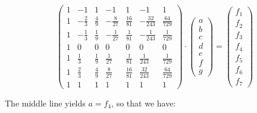 \[
\left(
\begin{array}{ccccccc}
1& -1       & 1       & -1           & 1 & -1 & 1  \\
1& -\frac23 & \frac49 & -\frac{8}{27}& \frac{16}{81} & -\frac{32}{243} & \frac{64}{729}  \\
1& -\frac13 & \frac19 & -\frac{1}{27}& \frac{1}{81}  & -\frac{1}{243}  & \frac{1}{729}  \\
1& 0        & 0       & 0            &0 & 0 & 0 \\
1& \frac13  & \frac19 & \frac{1}{27} & \frac{1}{81}  & \frac{1}{243}  & \frac{1}{729}  \\
1& \frac23  & \frac49 & \frac{8}{27} & \frac{16}{81} & \frac{32}{243} & \frac{64}{729}  \\
1& 1        & 1       & 1            & 1 & 1 & 1  
\end{array}
\right)
\cdot
\left(
\begin{array}{c}
a \\ b \\ c \\ d \\ e \\ f \\ g
\end{array}
\right)
=
\left(
\begin{array}{c}
f_1 \\ f_2 \\ f_3 \\ f_4 \\ f_5 \\ f_6 \\ f_7
\end{array}
\right)
\]


The middle line yields $a=f_4$, so that we have:

